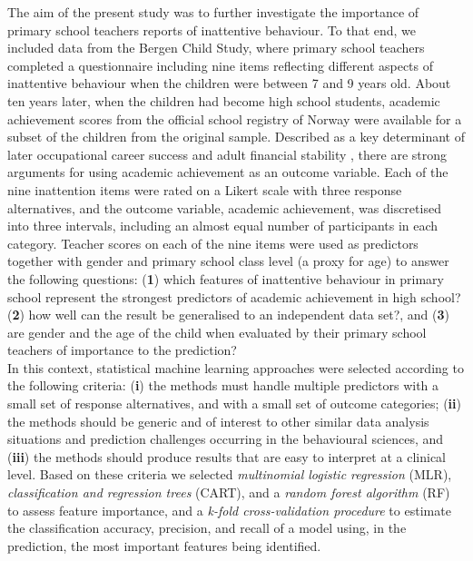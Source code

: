 \documentclass[10pt,letterpaper]{article}
\begin{document}
The aim of the present study was to further investigate the importance of primary school teachers reports of inattentive behaviour. 
To that end, we included data from the Bergen Child Study, where primary school teachers completed a questionnaire including nine items 
reflecting different aspects of inattentive behaviour when the children were between 7 and 9 years old. About ten years later, when the children 
had become high school students, academic achievement scores from the official school registry of Norway were available for a subset of 
the children from the original sample. Described as a key determinant of later occupational career success and adult
financial stability \cite{Fried2016}, there are strong arguments for using academic achievement as an outcome variable. Each of the nine inattention items were rated on a 
Likert scale with three response alternatives, and the outcome variable, academic achievement, was discretised into three intervals, including an almost equal number 
of participants in each category.  Teacher scores on each of the nine items were used as predictors together with gender and primary school class level (a proxy for age) 
to answer the following questions: ({\bf1}) which features of inattentive behaviour in primary school represent the strongest predictors of academic achievement in 
high school? ({\bf 2}) how well can the result be generalised to an independent data set?, and ({\bf3}) are gender and the age of the child 
when evaluated by their primary school teachers of importance to the prediction?  \\ 

In this context, statistical machine learning approaches were selected according to the following criteria: ({\bf i}) the methods must handle multiple predictors with a small set of response alternatives, and with a small set of outcome categories; ({\bf ii}) the methods should be generic and of interest to other similar data analysis situations  
and prediction challenges  occurring in the behavioural sciences, and ({\bf iii}) the methods should produce results that are easy to interpret at a clinical level. 
Based on these criteria we selected {\em multinomial logistic regression} (MLR), {\em classification and regression trees} (CART), and a {\em random forest algorithm} (RF) to assess feature importance, and a {\em k-fold cross-validation procedure} to estimate the classification accuracy,  precision, and recall of a model using, in the prediction, the most important features being identified. 
\end{document}

